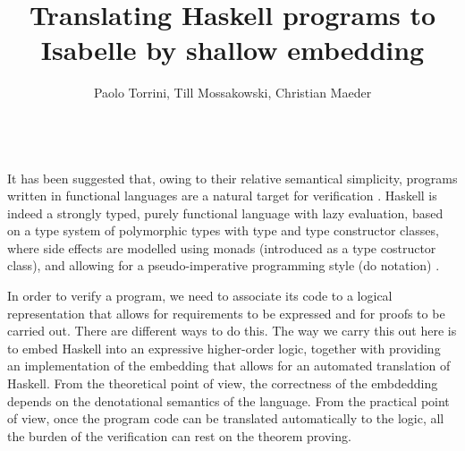 \documentclass[a4paper,12pt]{article}
\begin{document}
\title{Translating Haskell programs to Isabelle by shallow embedding}

\author{Paolo Torrini, Till Mossakowski, Christian Maeder} 


\date{}


\maketitle

\\


\noindent It has been suggested that, owing to their relative
semantical simplicity, programs written in functional languages are a
natural target for verification \cite{Thompson95}. Haskell is indeed a
strongly typed, purely functional language with lazy evaluation, based
on a type system of polymorphic types with type and type constructor
classes, where side effects are modelled using monads (introduced as a
type costructor class), and allowing for a pseudo-imperative
programming style (do notation) \cite{Hudak}.

In order to verify a program, we need to associate its code to a
logical representation that allows for requirements to be expressed
and for proofs to be carried out. There are different ways to do this.
The way we carry this out here is to embed Haskell into an expressive
higher-order logic, together with providing an implementation of the
embedding that allows for an automated translation of Haskell. From
the theoretical point of view, the correctness of the embdedding
depends on the denotational semantics of the language.  From the
practical point of view, once the program code can be translated
automatically to the logic, all the burden of the verification can
rest on the theorem proving.
\end{document}
